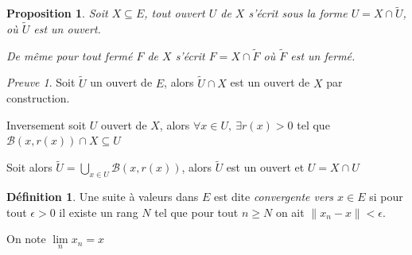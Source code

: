 \documentclass[]{article}
\newtheorem{myproposition}{Proposition}
\theoremstyle{remark}
\newtheorem{myproof}{Preuve}
\theoremstyle{definition}
\newtheorem{mydef}{Définition}
\begin{document}
\begin{myproposition}
	Soit $X \subseteq E$, tout ouvert $U$ de $X$ s'écrit sous la forme $U=X \cap \widetilde{U}$, où $\widetilde{U}$ est un ouvert.
	
	De même pour tout fermé $F$ de $X$ s'écrit $F=X \cap \widetilde{F}$ où $\widetilde{F}$ est un fermé.
\end{myproposition}

\begin{myproof}
	Soit $\widetilde{U}$ un ouvert de $E$, alors $\widetilde{U} \cap X$ est un ouvert de $X$ par construction.
	
	Inversement soit $U$ ouvert de $X$, alors $\forall x \in U, ~ \exists r(x) > 0$ tel que $\mathcal{B}(x, r(x)) \cap X \subseteq U$
	
	Soit alors $\displaystyle \widetilde{U} = \bigcup_{x \in U} \mathcal{B}(x, r(x))$, alors $\widetilde{U}$ est un ouvert et $U = X \cap U$ 
\end{myproof}

\begin{mydef}
	Une suite à valeurs dans $E$ est dite \textit{convergente vers $x \in E$} si pour tout $\epsilon > 0$ il existe un rang $N$ tel que pour tout $n \geqslant N$ on ait $\|x_n-x\| < \epsilon$.
	
	On note $\lim\limits_{n} x_n = x$
\end{mydef}
\end{document}
